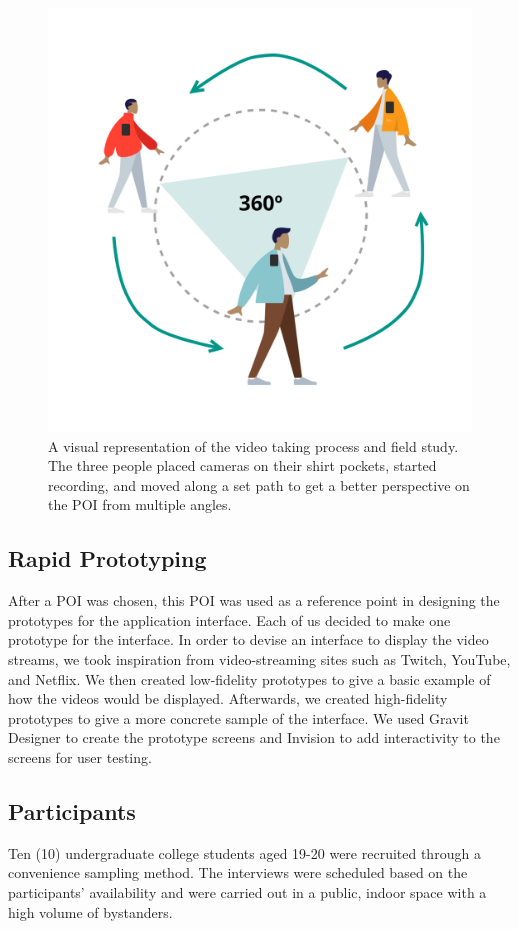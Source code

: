 \documentclass{sigchi}
\begin{document}
\begin{figure}[t]
    \centering
    \includegraphics[width = 1\linewidth]{figures/setup.png}
    \caption{A visual representation of the video taking process and field study. The three people placed cameras on their shirt pockets, started recording, and moved along a set path to get a better perspective on the POI from multiple angles. }
    \label{fig:setup}
\end{figure}

\subsection{Rapid Prototyping}
After a POI was chosen, this POI was used as a reference point in designing the prototypes for the application interface. Each of us decided to make one prototype for the interface. In order to devise an interface to display the video streams, we took inspiration from video-streaming sites such as Twitch, YouTube, and Netflix. We then created low-fidelity prototypes to give a basic example of how the videos would be displayed. Afterwards, we created high-fidelity prototypes to give a more concrete sample of the interface. We used Gravit Designer to create the prototype screens and Invision to add interactivity to the screens for user testing.

\subsection{Participants}
Ten (10) undergraduate college students aged 19-20 were recruited through a convenience sampling method. The interviews were scheduled based on the participants' availability and were carried out in a public, indoor space with a high volume of bystanders.
\end{document}
